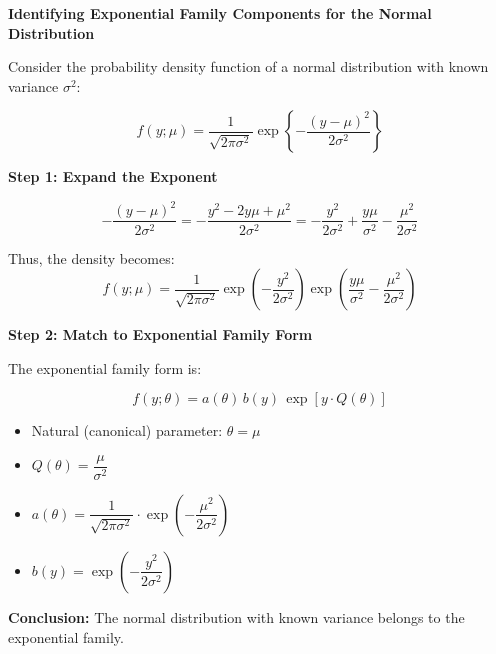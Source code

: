 \documentclass[12pt,a4paper]{article}
\begin{document}
\begin{example}
\textbf{Identifying Exponential Family Components for the Normal Distribution}

Consider the probability density function of a normal distribution with known variance \( \sigma^2 \):

\[
f(y; \mu) = \frac{1}{\sqrt{2\pi \sigma^2}} \exp\left\{ -\frac{(y - \mu)^2}{2\sigma^2} \right\}
\]

\textbf{Step 1: Expand the Exponent}

\[
-\frac{(y - \mu)^2}{2\sigma^2} = -\frac{y^2 - 2y\mu + \mu^2}{2\sigma^2} = -\frac{y^2}{2\sigma^2} + \frac{y\mu}{\sigma^2} - \frac{\mu^2}{2\sigma^2}
\]

Thus, the density becomes:
\[
f(y; \mu) = \frac{1}{\sqrt{2\pi \sigma^2}} \exp\left( -\frac{y^2}{2\sigma^2} \right) \exp\left( \frac{y\mu}{\sigma^2} - \frac{\mu^2}{2\sigma^2} \right)
\]

\textbf{Step 2: Match to Exponential Family Form}

The exponential family form is:

\[
f(y; \theta) = a(\theta)\, b(y)\, \exp\left[ y \cdot Q(\theta) \right]
\]
 

\begin{itemize}
  \item Natural (canonical) parameter: \( \theta = \mu \)
  \item \( Q(\theta) = \dfrac{\mu}{\sigma^2} \)
  \item \( a(\theta) = \dfrac{1}{\sqrt{2\pi \sigma^2}} \cdot \exp\left(-\dfrac{\mu^2}{2\sigma^2} \right) \)
  \item \( b(y) = \exp\left( -\dfrac{y^2}{2\sigma^2} \right) \)
\end{itemize}



\textbf{Conclusion:} The normal distribution with known variance belongs to the exponential family.
\end{example}

 


   

\end{document}
